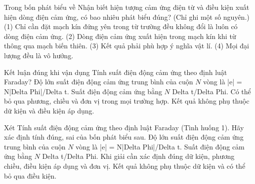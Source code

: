 \begin{ex}
Trong bốn phát biểu về Nhận biết hiện tượng cảm ứng điện từ và điều kiện xuất hiện dòng điện cảm ứng, có bao nhiêu phát biểu đúng? (Chỉ ghi một số nguyên.) (1) Chỉ cần đặt mạch kín đứng yên trong từ trường đều không đổi là luôn có dòng điện cảm ứng. (2) Dòng điện cảm ứng xuất hiện trong mạch kín khi từ thông qua mạch biến thiên. (3) Kết quả phải phù hợp ý nghĩa vật lí. (4) Mọi đại lượng đều là vô hướng.
\end{ex}

\begin{ex}
Kết luận đúng khi vận dụng Tính suất điện động cảm ứng theo định luật Faraday?
\choice
{\True Độ lớn suất điện động cảm ứng trung bình của cuộn $N$ vòng là |e| = N|Delta Phi|/Delta t.}
{Suất điện động cảm ứng bằng $N$ Delta t/Delta Phi.}
{Có thể bỏ qua phương, chiều và đơn vị trong mọi trường hợp.}
{Kết quả không phụ thuộc dữ kiện và điều kiện áp dụng.}
\end{ex}

\begin{ex}
Xét Tính suất điện động cảm ứng theo định luật Faraday (Tình huống 1). Hãy xác định tính đúng, sai của bốn phát biểu sau.
\choiceTF
{\True Độ lớn suất điện động cảm ứng trung bình của cuộn $N$ vòng là |e| = N|Delta Phi|/Delta t.}
{Suất điện động cảm ứng bằng $N$ Delta t/Delta Phi.}
{\True Khi giải cần xác định đúng dữ kiện, phương chiều, điều kiện áp dụng và đơn vị.}
{Kết quả không phụ thuộc dữ kiện và có thể bỏ qua điều kiện.}
\end{ex}

